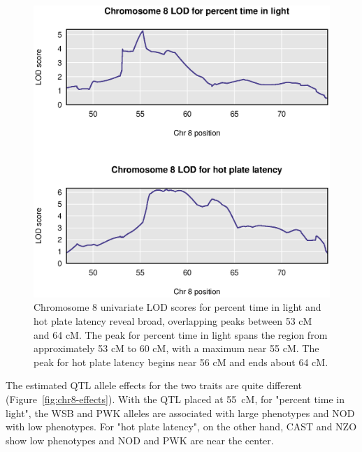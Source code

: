 \documentclass[12pt,twoside, lineno]{gsajnl}
\begin{document}
\begin{figure}
\includegraphics[width = \textwidth]{../Rmd/chr8-lods.eps}
\caption{Chromosome 8 univariate LOD scores for percent time in light
  and hot plate latency reveal broad, overlapping peaks between 53 cM
  and 64 cM. The peak for percent time in light spans the region from
  approximately 53 cM to 60 cM, with a maximum near 55 cM. The peak
  for hot plate latency begins near 56 cM and ends about 64 cM.}
\label{fig:chr8-lod}
\end{figure}


The estimated QTL allele effects for the two traits are quite
different (Figure~\ref{fig:chr8-effects}).
With the QTL placed at 55~cM, for "percent time in light", the WSB and PWK alleles are associated
with large phenotypes and NOD with low phenotypes.
For "hot plate latency", on the other hand,
CAST and NZO show low phenotypes and NOD and PWK are near the center.
\end{document}
